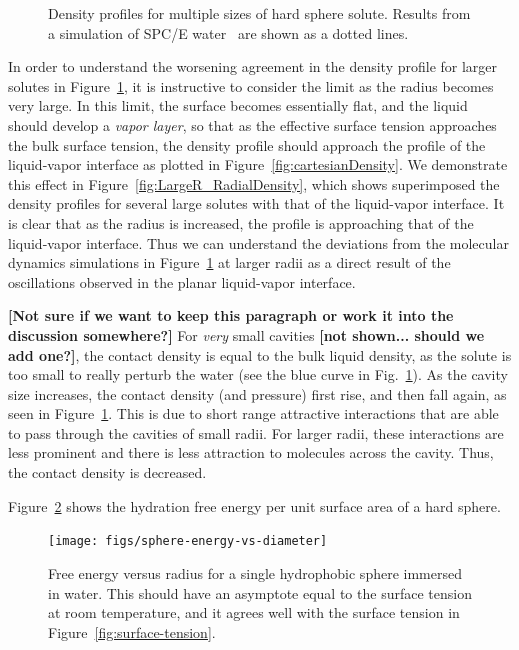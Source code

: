 \documentclass[letterpaper,twocolumn,amsmath,amssymb,prb]{revtex4-1}
\newcommand{\red}[1]{{\bf \color{red} #1}}
\newcommand{\fixme}[1]{\red{[#1]}}
\begin{document}
\begin{figure}[b]
\begin{center}
\end{center}
\caption{Density profiles for multiple sizes of hard sphere solute.
  Results from a simulation of SPC/E water~\cite{huang2001shs} are
  shown as a dotted lines.}
\label{fig:cavities}
\end{figure}

In order to understand the worsening agreement in the density profile
for larger solutes in Figure~\ref{fig:cavities}, it is instructive to
consider the limit as the radius becomes very large.  In this limit,
the surface becomes essentially flat, and the liquid should develop a
\emph{vapor layer}, so that as the effective surface tension
approaches the bulk surface tension, the density profile should
approach the profile of the liquid-vapor interface as plotted in
Figure~\ref{fig:cartesianDensity}.  We demonstrate this effect in
Figure~\ref{fig:LargeR_RadialDensity}, which shows superimposed the
density profiles for several large solutes with that of the
liquid-vapor interface.  It is clear that as the radius is increased,
the profile is approaching that of the liquid-vapor interface.  Thus
we can understand the deviations from the molecular dynamics
simulations in Figure~\ref{fig:cavities} at larger radii as a direct
result of the oscillations observed in the planar liquid-vapor
interface.

\fixme{Not sure if we want to keep this paragraph or work it into the
  discussion somewhere?} For \emph{very} small cavities \fixme{not
  shown... should we add one?}, the contact density is equal to the
bulk liquid density, as the solute is too small to really perturb the
water (see the blue curve in Fig.~\ref{fig:cavities}).  As the cavity
size increases, the contact density (and pressure) first rise, and
then fall again, as seen in Figure~\ref{fig:cavities}.  This is due to
short range attractive interactions that are able to pass through the
cavities of small radii.  For larger radii, these interactions are
less prominent and there is less attraction to molecules across the
cavity.  Thus, the contact density is decreased.

Figure~\ref{fig:sphere-energy-vs-diameter} shows the hydration free
energy per unit surface area of a hard sphere.

\begin{figure}
\begin{center}
\texttt{[image: figs/sphere-energy-vs-diameter]}
\end{center}
\caption{ Free energy versus radius for a single hydrophobic sphere
immersed in water. This should have an asymptote equal to the surface
tension at room temperature, and it agrees well with the surface tension in
Figure~\ref{fig:surface-tension}. }
\label{fig:sphere-energy-vs-diameter}
\end{figure}
\end{document}
